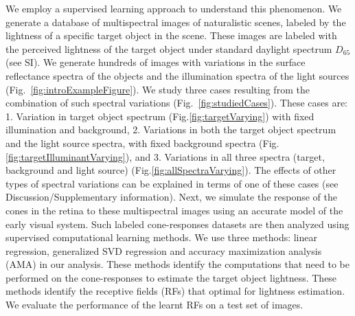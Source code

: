 \documentclass{jov}
\begin{document}
We employ a supervised learning approach to understand this phenomenon. We generate a database of multispectral images of naturalistic scenes, labeled by the lightness of a specific target object in the scene. These images are labeled with the perceived lightness of the target object under standard daylight spectrum $D_{65}$ (see SI). We generate hundreds of images with variations in the surface reflectance spectra of the objects and the illumination spectra of the light sources (Fig.~\ref{fig:introExampleFigure}). We study three cases resulting from the combination of such spectral variations (Fig.~\ref{fig:studiedCases}). These cases are: 1. Variation in target object spectrum (Fig.\ref{fig:targetVarying}) with fixed illumination and background, 2. Variations in both the target object spectrum and the light source spectra, with fixed background spectra (Fig.\ref{fig:targetIlluminantVarying}), and 3. Variations in all three spectra (target, background and light source) (Fig.\ref{fig:allSpectraVarying}). The effects of other types of spectral variations can be explained in terms of one of these cases (see Discussion/Supplementary information). Next, we simulate the response of the cones in the retina to these multispectral images using an accurate model of the early visual system. Such labeled cone-responses datasets are then analyzed using supervised computational learning methods. We use three methods: linear regression, generalized SVD regression and accuracy maximization analysis (AMA) in our analysis. These methods identify the computations that need to be performed on the cone-responses to estimate the target object lightness. These methods identify the receptive fields (RFs) that optimal for lightness estimation. We evaluate the performance of the learnt RFs on a test set of images.
\end{document}
